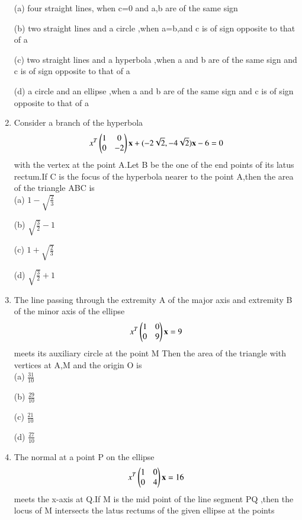 \documentclass[journal,12pt,twocolumn]{IEEEtran}
\begin{document}
\begin{enumerate}
      \choice (a) four straight lines, when c=0 and a,b are of the same sign 
      
      \choice (b) two straight lines and a circle ,when a=b,and c is of sign opposite to that of a
      
      \choice (c) two straight lines and a hyperbola ,when a and b are of the same sign and c is of sign opposite to that of a 
      
    \choice (d) a circle and an ellipse ,when a and b are of the same sign and c is of sign opposite to that of a\\
    
    \item Consider a branch  of the hyperbola \begin{align} x^T\begin{pmatrix}1&0\\0&-2\end{pmatrix}\mathbf x+(-2\sqrt{2},-4\sqrt{2})\mathbf x-6=0\end{align} with the vertex at the point A.Let B be the one of the end points of its latus rectum.If C is the focus of the hyperbola nearer to the point A,then the area of the triangle ABC is\\ 
    
    \choice (a) $1-\sqrt{\frac{2}{3}}$
    
    \choice (b) $\sqrt{\frac{3}{2}}-1$

    \choice (c) $1+\sqrt{\frac{2}{3}}$

    \choice (d) $\sqrt{\frac{3}{2}}+1$\\

\item The line passing through the extremity A of the major axis and extremity B of the minor axis of the ellipse  \begin{align}x^T\begin{pmatrix}1&0\\0&9 \end{pmatrix} \mathbf x =9\end{align}
meets its auxiliary circle at the point M Then the area of the triangle with vertices at A,M and the origin O is\\

\choice (a) $\frac{31}{10}$

\choice (b) $\frac{29}{10}$

\choice (c) $\frac{21}{10}$

\choice (d) $\frac{27}{10}$\\

\item The normal at a point P on the ellipse \begin{align}
 x^T\begin{pmatrix}1&0\\0&4\end{pmatrix} \mathbf x =16\end{align} meets the x-axis at Q.If M is the mid point of the line segment PQ ,then the locus of M intersects the latus rectums of the given ellipse at the points\\  


\end{enumerate}
\end{document}
